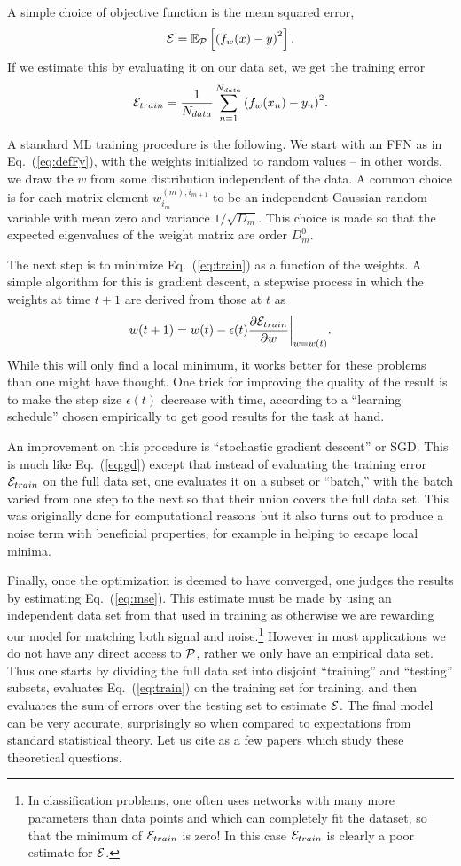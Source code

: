 \documentclass[12pt]{article}
\def\E#1#2{\mathbb{E}_{#1}\left[#2\right]}
\def\CP {{\cal P }}
\def\CE {{\cal E}}
\newcommand{\eq}[1]{Eq.~(\ref{eq:#1})}
\newcommand{\be}{\begin{equation}}
\newcommand{\ee}{\end{equation}}
\begin{document}
A simple choice of objective function is the mean squared error, 
\be \label{eq:mse}
\CE = \E{\CP}{ \left(f_w(x) - y\right)^2 }.
\ee
If we estimate this by evaluating it on our data set, we get the training error
\be \label{eq:train}
\CE_{train} =  \frac{1}{N_{data}} \sum_{n=1}^{N_{data}}{ \left(f_w(x_n) - y_n\right)^2 }.
\ee

A standard ML training procedure is the following.  We start with an FFN as in \eq{defFy},
with the weights initialized to random values -- in other words, we draw the $w$ from some distribution
independent of the data.  A common choice is for each matrix element $w_{i_m}^{(m),i_{m+1}}$ to be
an independent Gaussian random variable with mean zero and variance $1/\sqrt{D_m}$.  This choice is made so that
the expected eigenvalues of the weight matrix are order $D_m^0$.

The next step is to minimize \eq{train} as a function of the weights.  A simple algorithm for this is
gradient descent, a stepwise process in which the weights at time $t+1$ are derived from those at $t$ as
\be \label{eq:gd}
w({t+1}) = w({t}) - \epsilon(t) \frac{ \partial \CE_{train} } { \partial w }\bigg|_{w=w(t)} .
\ee 
While this will only find a local minimum, it works better for these problems than one might have thought.
One trick for improving the quality of the result is
to make the step size $\epsilon(t)$ decrease with time, according to a ``learning schedule''
chosen empirically to get good results for the task at hand.

An improvement on this procedure is ``stochastic gradient descent'' or SGD.  This is much like \eq{gd}
except that instead of evaluating the training error $\CE_{train}$ on the full data set, one evaluates it on
a subset or ``batch,'' with the batch varied from one step to the next so that their union covers the full data set.  This was
originally done for computational reasons but it also turns out to produce a noise term with beneficial 
properties, for example in helping to escape local minima.  

Finally, once the optimization is deemed to have converged, one judges the results by estimating \eq{mse}.
This estimate must be made by using an independent data set from that used in training as otherwise we are
rewarding our model for matching both signal and noise.\footnote{In classification problems, one often uses networks
with many more parameters than data points and which can completely fit the dataset, so that the minimum
of $\CE_{train}$ is zero!  In this case $\CE_{train}$ is clearly a poor estimate for $\CE$.}
However in most applications we do not have any direct access to $\CP$, rather we only have an empirical
data set.  Thus one starts by dividing the full data set into disjoint ``training'' and ``testing'' subsets, evaluates
\eq{train} on the training set for training, and then evaluates the sum of errors over the testing set to estimate $\CE$. 
The final model can be very accurate, surprisingly so when compared to expectations from standard
statistical theory.  Let us cite \cite{} as a few papers which study these theoretical questions.
\end{document}
